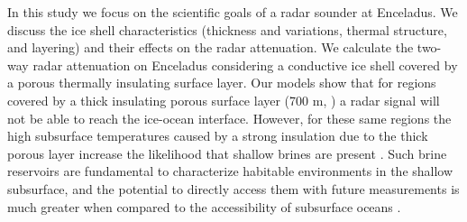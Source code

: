 \documentclass[11pt]{article}
\begin{document}
In this study we focus on the scientific goals of a radar sounder at Enceladus. We discuss the ice shell characteristics (thickness and variations, thermal structure, and layering) and their effects on the radar attenuation. We calculate the two-way radar attenuation on Enceladus considering a conductive ice shell covered by a porous thermally insulating surface layer. Our models show that for regions covered by a thick insulating porous surface layer (700 m, \parencite{martin2023}) a radar signal will not be able to reach the ice-ocean interface. However, for these same regions the high subsurface temperatures caused by a strong insulation due to the thick porous layer increase the likelihood that shallow brines are present \parencite{byrne2024dat}. Such brine reservoirs are fundamental to characterize habitable environments in the shallow subsurface, and the potential to directly access them with future measurements is much greater when compared to the accessibility of subsurface oceans \parencite{wolfenbarger2022}.

\printbibliography[title={References}]
\end{document}
